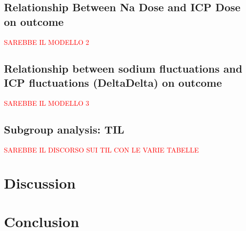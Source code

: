 \subsection{Relationship Between Na Dose and ICP Dose on outcome}
\textcolor{red}{SAREBBE IL MODELLO 2}

\subsection{Relationship between sodium fluctuations and ICP fluctuations (DeltaDelta) on outcome}
\textcolor{red}{SAREBBE IL MODELLO 3}

\subsection{Subgroup analysis: TIL}
\textcolor{red}{SAREBBE IL DISCORSO SUI TIL CON LE VARIE TABELLE}

\section{Discussion}

\section{Conclusion}





